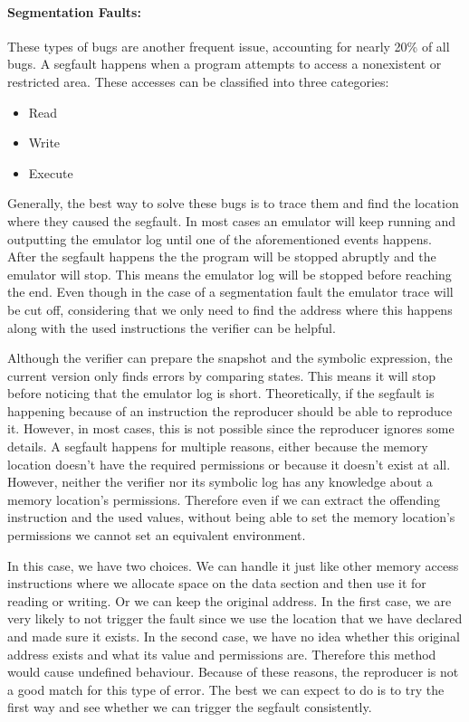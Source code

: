 \paragraph{Segmentation Faults:}
These types of bugs are another frequent issue, accounting for nearly 20\% of all bugs.
A \ac{segfault} happens when a program attempts to access a nonexistent or restricted area.
These accesses can be classified into three categories:
\begin{itemize}
  \item Read
  \item Write
  \item Execute
\end{itemize}
Generally, the best way to solve these bugs is to trace them and find the location where they caused the \ac{segfault}.
In most cases an emulator will keep running and outputting the emulator log until one of the aforementioned events happens.
After the \ac{segfault} happens the the program will be stopped abruptly and the emulator will stop.
This means the emulator log will be stopped before reaching the end.
Even though in the case of a segmentation fault the emulator trace will be cut off, considering that we only need to find the address where this happens along with the used instructions the verifier can be helpful.

Although the verifier can prepare the snapshot and the symbolic expression, the current version only finds errors by comparing states.
This means it will stop before noticing that the emulator log is short.
Theoretically, if the \ac{segfault} is happening because of an instruction the reproducer should be able to reproduce it. 
However, in most cases, this is not possible since the reproducer ignores some details.
A \ac{segfault} happens for multiple reasons, either because the memory location doesn't have the required permissions or because it doesn't exist at all.
However, neither the verifier nor its symbolic log has any knowledge about a memory location's permissions.
Therefore even if we can extract the offending instruction and the used values, without being able to set the memory location's permissions we cannot set an equivalent environment.

In this case, we have two choices.
We can handle it just like other memory access instructions where we allocate space on the data section and then use it for reading or writing.
Or we can keep the original address.
In the first case, we are very likely to not trigger the fault since we use the location that we have declared and made sure it exists.
In the second case, we have no idea whether this original address exists and what its value and permissions are.
Therefore this method would cause undefined behaviour.
Because of these reasons, the reproducer is not a good match for this type of error.
The best we can expect to do is to try the first way and see whether we can trigger the \ac{segfault} consistently.

